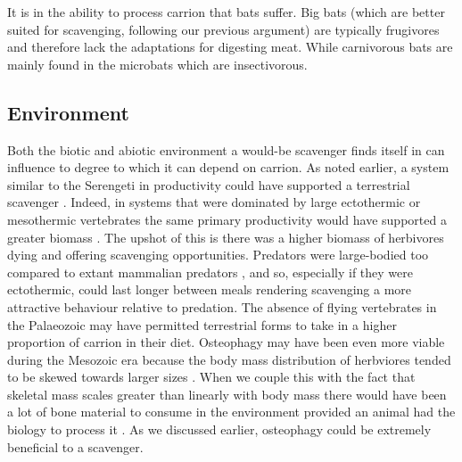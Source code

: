 \documentclass[a4paper,12pt]{article}
\begin{document}
It is in the ability to process carrion that bats suffer.
Big bats (which are better suited for scavenging, following our previous argument) are typically frugivores and therefore lack the adaptations for digesting  meat.
While carnivorous bats are mainly found in the microbats which are insectivorous.


\subsection*{Environment}
Both the biotic and abiotic environment a would-be scavenger finds itself in can influence to degree to which it can depend on carrion. 
As noted earlier, a system similar to the Serengeti in productivity could have supported a terrestrial scavenger \citep{ruxton2004obligate}.
Indeed, in systems that were dominated by large ectothermic or mesothermic vertebrates 
the same primary productivity would have supported a greater biomass \citep{mcnab2009resources}.
The upshot of this is there was a higher biomass of herbivores dying and offering scavenging opportunities.
Predators were large-bodied too compared to extant mammalian predators \citep{mcnab2009resources}, and so, especially if they were ectothermic, could last longer between meals rendering scavenging a more attractive behaviour relative to predation.
The absence of flying vertebrates in the Palaeozoic may have permitted terrestrial forms to take in a higher proportion of carrion in their diet.
Osteophagy may have been even more viable during the Mesozoic era because the body mass distribution of herbviores tended to be skewed towards larger sizes \citep{10.1371/journal.pone.0051925}.
When we couple this with the fact that skeletal mass scales greater than linearly with body mass \citep{prange1979scaling} there would have been a lot of bone material to consume in the environment provided an animal had the biology to process it \citep{chure1997one}.
As we discussed earlier, osteophagy could be extremely beneficial to a scavenger.
\end{document}
